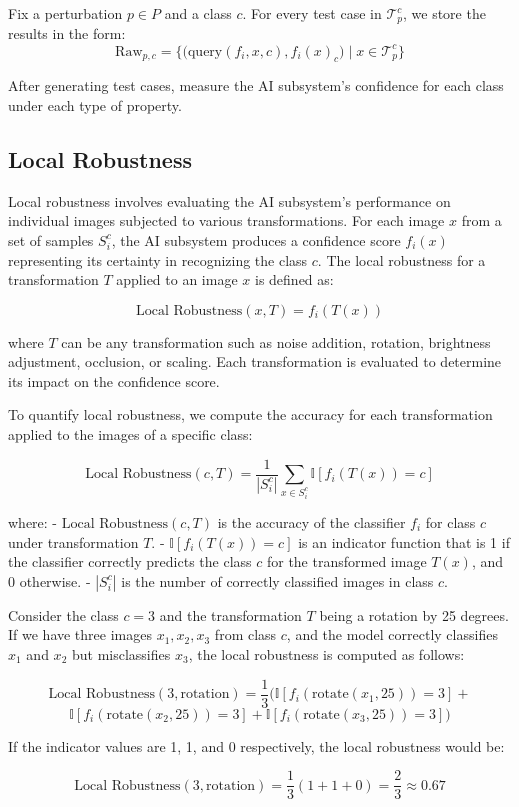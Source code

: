 Fix a perturbation \( p \in P \) and a class \( c \). For every test case in \( \mathcal{T}_p^c \), we store the results in the form:
\[ \text{Raw}_{p, c} = \Big\{\big(\text{query}(f_i, x, c), f_i(x)_c\big) \mid x \in \mathcal{T}_p^c \Big\} \]

After generating test cases, measure the AI subsystem's confidence for each class under each type of property.

\subsection{Local Robustness}

Local robustness involves evaluating the AI subsystem's performance on individual images subjected to various transformations. For each image \( x \) from a set of samples \( S_i^c \), the AI subsystem produces a confidence score \( f_i(x) \) representing its certainty in recognizing the class \( c \). The local robustness for a transformation \( T \) applied to an image \( x \) is defined as:

\[ \text{Local Robustness}(x, T) = f_i(T(x)) \]

where \( T \) can be any transformation such as noise addition, rotation, brightness adjustment, occlusion, or scaling. Each transformation is evaluated to determine its impact on the confidence score.

To quantify local robustness, we compute the accuracy for each transformation applied to the images of a specific class:

\[
\text{Local Robustness}(c, T) = \frac{1}{|S_i^c|} \sum_{x \in S_i^c} \mathbb{I}[f_i(T(x)) = c]
\]

where:
- \(\text{Local Robustness}(c, T)\) is the accuracy of the classifier \( f_i \) for class \( c \) under transformation \( T \).
- \( \mathbb{I}[f_i(T(x)) = c] \) is an indicator function that is 1 if the classifier correctly predicts the class \( c \) for the transformed image \( T(x) \), and 0 otherwise.
- \(|S_i^c|\) is the number of correctly classified images in class \( c \).

\begin{example}
Consider the class \( c = 3 \) and the transformation \( T \) being a rotation by 25 degrees. If we have three images \( x_1, x_2, x_3 \) from class \( c \), and the model correctly classifies \( x_1 \) and \( x_2 \) but misclassifies \( x_3 \), the local robustness is computed as follows:

\[
\text{Local Robustness}(3, \text{rotation}) = \frac{1}{3} (\mathbb{I}[f_i(\text{rotate}(x_1, 25)) = 3] + 
\]
\[
\mathbb{I}[f_i(\text{rotate}(x_2, 25)) = 3] + \mathbb{I}[f_i(\text{rotate}(x_3, 25)) = 3])
\]


If the indicator values are 1, 1, and 0 respectively, the local robustness would be:

\[
\text{Local Robustness}(3, \text{rotation}) = \frac{1}{3} (1 + 1 + 0) = \frac{2}{3} \approx 0.67
\]
\end{example}

